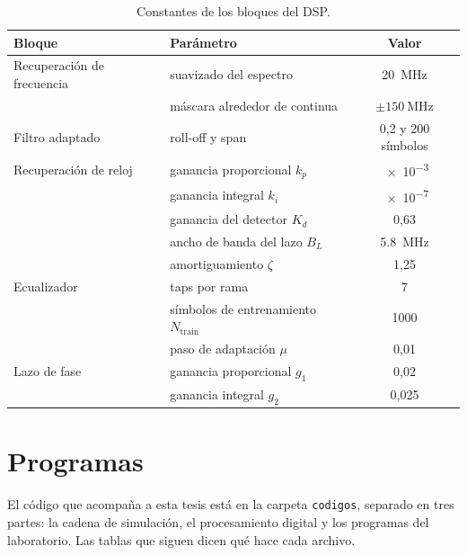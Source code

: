 \begin{table}[htbp]
  \centering
  \begin{tabular}{llc}
    \toprule
    Bloque & Par\'ametro & Valor \\
    \midrule
    Recuperaci\'on de frecuencia & suavizado del espectro        & \SI{20}{\mega\hertz} \\
                                 & m\'ascara alrededor de continua & $\pm\SI{150}{\mega\hertz}$ \\
    Filtro adaptado              & roll-off y span               & 0,2 y 200 s\'imbolos \\
    Recuperaci\'on de reloj      & ganancia proporcional $k_p$   & \num{e-3} \\
                                 & ganancia integral $k_i$       & \num{e-7} \\
                                 & ganancia del detector $K_d$   & 0,63 \\
                                 & ancho de banda del lazo $B_L$ & \SI{5.8}{\mega\hertz} \\
                                 & amortiguamiento $\zeta$       & 1,25 \\
    Ecualizador                  & taps por rama                 & 7 \\
                                 & s\'imbolos de entrenamiento $N_{\mathrm{train}}$ & 1000 \\
                                 & paso de adaptaci\'on $\mu$    & 0,01 \\
    Lazo de fase                 & ganancia proporcional $g_1$   & 0,02 \\
                                 & ganancia integral $g_2$       & 0,025 \\
    \bottomrule
  \end{tabular}
  \caption[Constantes del procesamiento digital]{%
    Constantes de los bloques del DSP.}
  \label{tab:ap-dsp}
\end{table}

\section{Programas}
\label{sec:ap-codigos}

El c\'odigo que acompa\~na a esta tesis est\'a en la carpeta \texttt{codigos},
separado en tres partes: la cadena de simulaci\'on, el procesamiento digital y
los programas del laboratorio. Las tablas que siguen dicen qu\'e hace cada
archivo.

